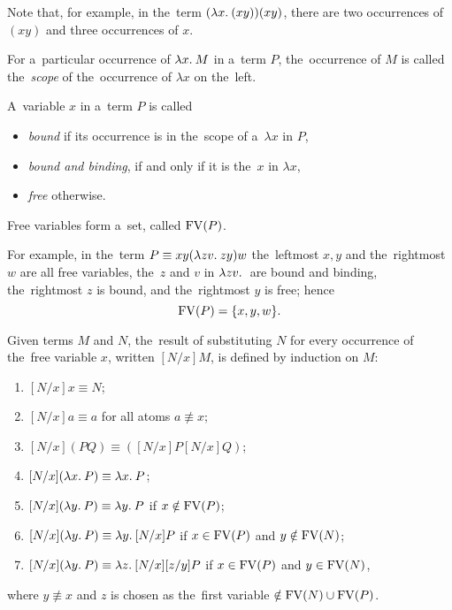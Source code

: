 Note that, for example, in the~term $(\lambda x . \: ( x y)) (x y)$, there are two
occurrences of $(x y)$ and three occurrences of $x$.

\begin{definition}
  For a~particular occurrence of $\lambda x . \: M$ in a~term $P$, the~occurrence of $M$
  is called the~\emph{scope} of the~occurrence of $\lambda x$ on the~left.
\end{definition}

\begin{definition}
  A~variable $x$ in a~term $P$ is called
  \begin{itemize}
    \item \emph{bound} if its occurrence is in the~scope of a~$\lambda x$ in $P$,
    \item \emph{bound and binding}, if and only if it is the~$x$ in $\lambda x$,
    \item \emph{free} otherwise.
  \end{itemize}
  Free variables form a~set, called $\mathrm{FV}(P)$.
\end{definition}

For example, in the~term $P \equiv xy(\lambda zv . \: zy)w$ the~leftmost $x, y$ and
the~rightmost $w$ are all free variables, the~$z$ and $v$ in $\lambda zv . \: $ are
bound and binding, the~rightmost $z$ is bound, and the~rightmost $y$ is free;
hence
\[
  \mathrm{FV}(P) = \{x, y, w\} .
\]

\begin{definition}[Substitution]\label{def:substitution}
  Given terms $M$ and $N$, the~result of substituting $N$ for every occurrence
  of the~free variable $x$, written $[N/x]M$, is defined by induction on $M$:
  \begin{enumerate}
    \item $[N/x]x  \equiv N$;
    \item $[N/x]a  \equiv a$  \hfill for all atoms $a \not\equiv x$;
    \item $[N/x](P Q)  \equiv ([N/x]P [N/x]Q)$;
    \item $[N/x](\lambda x . \: P)  \equiv \lambda x . \: P$;
    \item $[N/x](\lambda y . \: P)  \equiv \lambda y . \: P$ \hfill if $x \notin \mathrm{FV}(P)$;
    \item $[N/x](\lambda y . \: P)  \equiv \lambda y . \: [N/x]P$
      \hfill if $x \in \mathrm{FV}(P)$ and $y \notin \mathrm{FV}(N)$;
    \item \label{def:substitution:g_item} $[N/x](\lambda y . \: P)
      \equiv \lambda z . \: [N/x][z/y]P$ \hfill if $x \in \mathrm{FV}(P)$ and $y \in \mathrm{FV}(N)$,
  \end{enumerate}
  where $y \not\equiv x$ and $z$ is chosen as the~first variable $\notin \mathrm{FV}(N)
  \cup \mathrm{FV}(P)$.
\end{definition}

